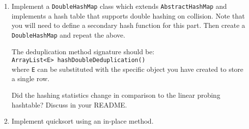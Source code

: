 \documentclass[12pt]{article}
\begin{document}
\begin{enumerate}
\item Implement a \verb+DoubleHashMap+ class which extends \verb+AbstractHashMap+ and implements a hash table that supports double hashing on collision. Note that you will need to define a secondary hash function for this part. Then create a \verb+DoubleHashMap+ and repeat the above. 

The deduplication method signature should be:\\
\verb+ArrayList<E> hashDoubleDeduplication()+\\
where \verb+E+ can be substituted with the specific object you have created to store a single row. 

Did the hashing statistics change in comparison to the linear probing hashtable? Discuss in your README.  

\item Implement quicksort using an in-place method.
\end{enumerate}
\end{document}

